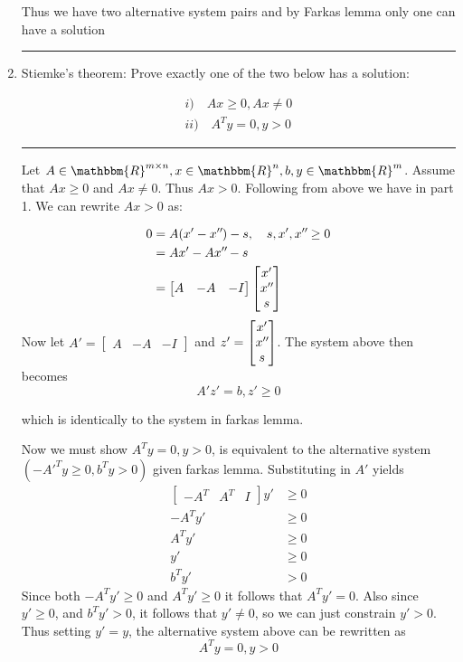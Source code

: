 \documentclass{article} %
\newcommand{\R}{\mathbbm{R}}
\newcommand*{\dprime}{^{\prime\prime}\mkern-1.2mu}
\begin{document}
\begin{enumerate}
Thus we have two alternative system pairs and by Farkas lemma only one can have a solution
\rule{\textwidth}{1pt}
\item Stiemke's theorem: Prove exactly one of the two below has a solution:

\begin{gather*}
i) \quad Ax \geq 0, Ax \neq 0 \\ 
ii) \quad A^T y = 0, y > 0 
\end{gather*}
\rule{\textwidth}{1pt}
Let $A \in \R^{m \times n}, x \in \R^n, b, y \in \R^{m}$. Assume  that $Ax \geq 0$ and $Ax \neq 0$. Thus $Ax > 0$. Following from above we have in part 1. We can rewrite $Ax > 0$ as:

\begin{equation*}
\begin{aligned}
0 & = A(x' - x \dprime ) - s , \quad s, x', x \dprime \geq 0 \\ 
&= Ax' - A x \dprime - s \\ 
&= \begin{bmatrix} A & -A  & - I \end{bmatrix} \begin{bmatrix} x' \\ x\dprime \\ s\end{bmatrix}
\end{aligned}
\end{equation*}
Now let $A' =\begin{bmatrix} A & -A  & - I \end{bmatrix}$ and $z' =\begin{bmatrix} x' \\ x\dprime \\ s\end{bmatrix}$. The system above then becomes
\[
A' z' = b, z' \geq 0
\]

which is identically to the system in farkas lemma.

Now we must show $A^T y = 0, y > 0$, is equivalent to  the alternative system $(-A'^T y \geq 0, b^T y > 0)$ given farkas lemma. Substituting in $A'$ yields
\begin{equation*}
\begin{aligned}
\begin{bmatrix} -A^T & A^T  & I \end{bmatrix} y' & \geq 0  \\ 
-A^T y' &\geq 0  \\ 
A^T y' &\geq 0  \\ 
y' &\geq 0 \\ 
b^T y' & >  0
\end{aligned}
\end{equation*}
Since both $-A^T y' \geq 0$ and $A^{T} y' \geq 0$ it follows that $A^T y' = 0$. Also since $y' \geq 0$, and $b^{T} y' > 0$, it follows that $y' \neq 0$, so we can just constrain $y' > 0$. Thus setting $y' = y$, the alternative system above can be rewritten as 
\[
A^Ty = 0, y >0
\]


\end{enumerate}
\end{document}
